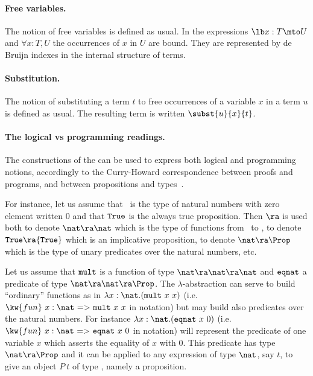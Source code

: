 \paragraph{Free variables.}
The notion of free variables is defined as usual.  In the expressions
$\lb x:T\mto U$ and $\forall x:T, U$ the occurrences of $x$ in $U$
are bound.  They are represented by de Bruijn indexes in the internal
structure of terms.

\paragraph[Substitution.]{Substitution.}
The notion of substituting a term $t$ to free occurrences of a
variable $x$ in a term $u$ is defined as usual. The resulting term
is written $\subst{u}{x}{t}$.

\paragraph[The logical vs programming readings.]{The logical vs programming readings.}

The constructions of the {\CIC} can be used to express both logical
and programming notions, accordingly to the Curry-Howard
correspondence between proofs and programs, and between propositions
and types~\cite{Cur58,How80,Bru72}.

For instance, let us assume that \nat\ is the type of natural numbers
with zero element written $0$ and that ${\tt True}$ is the always true
proposition.  Then $\ra$ is used both to denote $\nat\ra\nat$ which is
the type of functions from \nat\ to \nat, to denote ${\tt True}\ra{\tt
  True}$ which is an implicative proposition, to denote $\nat \ra
\Prop$ which is the type of unary predicates over the natural numbers,
etc.

Let us assume that ${\tt mult}$ is a function of type $\nat\ra\nat\ra
\nat$ and ${\tt eqnat}$ a predicate of type $\nat\ra\nat\ra \Prop$.
The $\lambda$-abstraction can serve to build ``ordinary'' functions as
in $\lambda x:\nat.({\tt mult}~x~x)$ (i.e. $\kw{fun}~x:\nat ~{\tt =>}~
{\tt mult} ~x~x$ in {\Coq} notation) but may build also predicates
over the natural numbers. For instance $\lambda x:\nat.({\tt eqnat}~
x~0)$ (i.e. $\kw{fun}~x:\nat ~{\tt =>}~ {\tt eqnat}~ x~0$ in {\Coq}
notation) will represent the predicate of one variable $x$ which
asserts the equality of $x$ with $0$. This predicate has type $\nat
\ra \Prop$ and it can be applied to any expression of type ${\nat}$,
say $t$, to give an object $P~t$ of type \Prop, namely a proposition.

